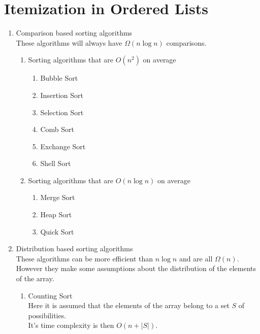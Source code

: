\documentclass[12pt]{report}
\begin{document}
\section{Itemization in Ordered Lists}
\begin{enumerate}
    \item Comparison based sorting algorithms\\
          These algorithms will always have $\Omega(n\log n)$ comparisons.
          \begin{enumerate}
              \item Sorting algorithms that are $O(n^2)$ on average
                    \begin{enumerate}
                        \item Bubble Sort
                        \item Insertion Sort
                        \item Selection Sort
                        \item Comb Sort
                        \item Exchange Sort
                        \item Shell Sort
                    \end{enumerate}
              \item Sorting algorithms that are $O(n\log n)$ on average
                    \begin{enumerate}
                        \item Merge Sort
                        \item Heap Sort
                        \item Quick Sort
                    \end{enumerate}
          \end{enumerate}
    \item Distribution based sorting algorithms\\
          These algorithms can be more efficient than $n\log n$ and are all $\Omega(n)$.\\
          However they make some assumptions about the distribution of the elements of the array.
          \begin{enumerate}
              \item Counting Sort\\
                    Here it is assumed that the elements of the array belong to a set $S$ of possibilities.\\
                    It's time complexity is then $O(n + |S|)$.

\end{enumerate}
\end{enumerate}
\end{document}
